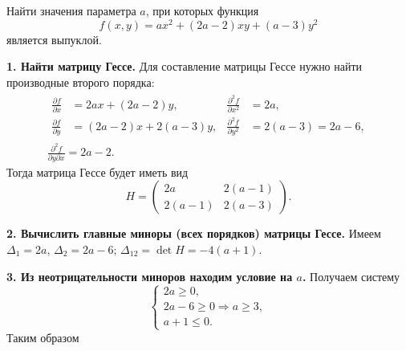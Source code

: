 \begin{example}
  Найти значения параметра $ a $, при которых функция 
  \[
      f(x, y) = ax^2 + (2a-2)xy + (a-3)y^2
  \]
  является выпуклой.
  \begin{solution}
    \textbf{1. Найти матрицу Гессе.} Для составление матрицы Гессе нужно найти
    производные второго порядка: 
    \begin{gather*}
    \begin{aligned}
      \frac{\partial f}{\partial x} &= 2ax + (2a-2)y, & \frac{\partial^2
      f}{\partial x^2} &=2a, \\
      \frac{\partial f}{\partial y} &= (2a-2)x + 2(a-3) y, & \frac{\partial^2
      f}{\partial y^2} &= 2(a-3) = 2a - 6,
    \end{aligned} \\ 
    \frac{\partial^2 f}{\partial y \partial x} = 2a -2.
  \end{gather*}
  Тогда матрица Гессе будет иметь вид 
  \[
      H = \begin{pmatrix}
        2a & 2(a-1) \\
        2(a-1) & 2(a-3)
      \end{pmatrix}.
  \]

  \textbf{2. Вычислить главные миноры (всех порядков) матрицы Гессе.} Имеем $
  \Delta_1 = 2a $, $ \Delta_2 = 2a -6 $; $ \Delta_{12} = \det H = -4(a+1) $.

  \textbf{3. Из неотрицательности миноров находим условие на $ a $.} Получаем
  систему  
  \[
      \begin{cases}
        2a \geqslant 0, \\
        2a - 6 \geqslant 0 \Rightarrow a \geqslant 3, \\
        a + 1 \leqslant 0.
      \end{cases}
  \]
  Таким образом  
    
  \end{solution}
\end{example}
